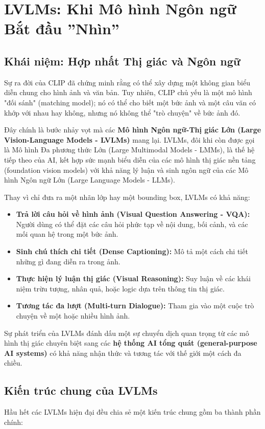 \section{LVLMs: Khi Mô hình Ngôn ngữ Bắt đầu ''Nhìn''}
\label{sec:lvlms}

\subsection{Khái niệm: Hợp nhất Thị giác và Ngôn ngữ}
\label{subsec:lvlm_concept}
Sự ra đời của CLIP đã chứng minh rằng có thể xây dựng một không gian biểu diễn chung cho hình ảnh và văn bản. Tuy nhiên, CLIP chủ yếu là một mô hình "đối sánh" (matching model); nó có thể cho biết một bức ảnh và một câu văn có khớp với nhau hay không, nhưng nó không thể "trò chuyện" về bức ảnh đó.

Đây chính là bước nhảy vọt mà các \textbf{Mô hình Ngôn ngữ-Thị giác Lớn (Large Vision-Language Models - LVLMs)} mang lại. LVLMs, đôi khi còn được gọi là Mô hình Đa phương thức Lớn (Large Multimodal Models - LMMs), là thế hệ tiếp theo của AI, kết hợp sức mạnh biểu diễn của các mô hình thị giác nền tảng (foundation vision models) với khả năng lý luận và sinh ngôn ngữ của các Mô hình Ngôn ngữ Lớn (Large Language Models - LLMs).

Thay vì chỉ đưa ra một nhãn lớp hay một bounding box, LVLMs có khả năng:
\begin{itemize}
	\item \textbf{Trả lời câu hỏi về hình ảnh (Visual Question Answering - VQA):} Người dùng có thể đặt các câu hỏi phức tạp về nội dung, bối cảnh, và các mối quan hệ trong một bức ảnh.
	\item \textbf{Sinh chú thích chi tiết (Dense Captioning):} Mô tả một cách chi tiết những gì đang diễn ra trong ảnh.
	\item \textbf{Thực hiện lý luận thị giác (Visual Reasoning):} Suy luận về các khái niệm trừu tượng, nhân quả, hoặc logic dựa trên thông tin thị giác.
	\item \textbf{Tương tác đa lượt (Multi-turn Dialogue):} Tham gia vào một cuộc trò chuyện về một hoặc nhiều hình ảnh.
\end{itemize}
Sự phát triển của LVLMs đánh dấu một sự chuyển dịch quan trọng từ các mô hình thị giác chuyên biệt sang các \textbf{hệ thống AI tổng quát (general-purpose AI systems)} có khả năng nhận thức và tương tác với thế giới một cách đa chiều.

\subsection{Kiến trúc chung của LVLMs}
\label{subsec:lvlm_general_architecture}
Hầu hết các LVLMs hiện đại đều chia sẻ một kiến trúc chung gồm ba thành phần chính:

